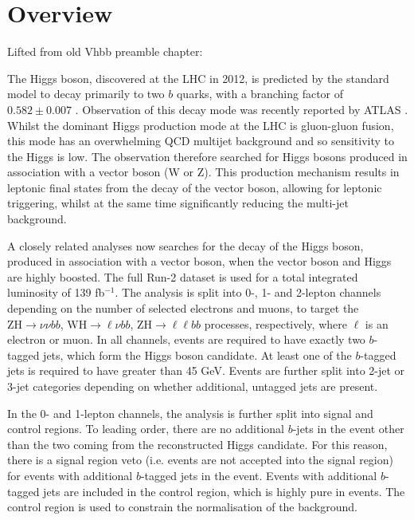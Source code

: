 \section{Overview}

Lifted from old Vhbb preamble chapter:

The Higgs boson, discovered at the LHC in 2012, is predicted by the standard model to decay primarily to two $b$ quarks, with a branching factor of $0.582 \pm 0.007$ \cite{2016arXiv161007922D:2016:higgs}. 
Observation of this decay mode was recently reported by ATLAS \cite{HIGG-2018-04}. Whilst the dominant Higgs production mode at the LHC is gluon-gluon fusion, this mode has an overwhelming QCD multijet background and so sensitivity to the Higgs is low. The \hbb observation therefore searched for Higgs bosons produced in association with a vector boson (W or Z). This production mechanism results in leptonic final states from the decay of the vector boson, allowing for leptonic triggering, whilst at the same time significantly reducing the multi-jet background. 

A closely related analyses now searches for the \hbb decay of the Higgs boson, produced in association with a vector boson, when the vector boson and Higgs are highly boosted. The full Run-2 dataset is used for a total integrated luminosity of 139 fb$^{-1}$. The analysis is split into 0-, 1- and 2-lepton channels depending on the number of selected electrons and muons, to target the $\text{ZH} \rightarrow \nu\nu bb$, $\text{WH} \rightarrow \ell\nu bb$, $\text{ZH} \rightarrow \ell\ell bb$ processes, respectively, where $\ell$ is an electron or muon. In all channels, events are required to have exactly two $b$-tagged jets, which form the Higgs boson candidate. At least one of the $b$-tagged jets is required to have \pT greater than 45 GeV. Events are further split into 2-jet or 3-jet categories depending on whether additional, untagged jets are present. 

In the 0- and 1-lepton channels, the analysis is further split into signal and control regions. To leading order, there are no additional $b$-jets in the event other than the two coming from the reconstructed Higgs candidate. For this reason, there is a signal region veto (i.e. events are not accepted into the signal region) for events with additional $b$-tagged jets in the event. Events with additional $b$-tagged jets are included in the control region, which is highly pure in \ttbar events. The control region is used to constrain the normalisation of the \ttbar background.


